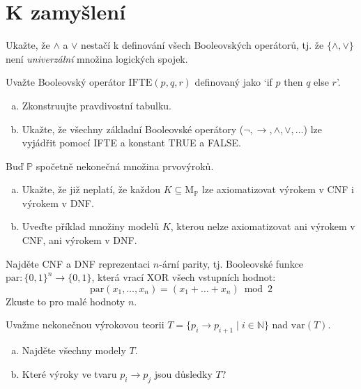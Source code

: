 \documentclass[a4paper,11pt]{amsart}
\begin{document}
\section*{K zamyšlení}


\begin{problem}
    
    Ukažte, že $\wedge$ a $\vee$ nestačí k definování všech Booleovských operátorů, tj. že $\{\wedge,\vee\}$ není \emph{univerzální} množina logických spojek.

\end{problem}


\begin{problem}
    
    Uvažte Booleovský operátor $\mathrm{IFTE}(p, q, r)$ definovaný jako `if $p$ then $q$ else $r$'. 
    \begin{enumerate}[(a)]
        \item Zkonstruujte pravdivostní tabulku.
        \item Ukažte, že všechny základní Booleovské operátory ($\neg, \to, \wedge,\vee,\dots$) lze vyjádřit pomocí IFTE a konstant TRUE a FALSE.
    \end{enumerate}

\end{problem}


\begin{problem} 
    
    Buď $\mathbb P$ spočetně nekonečná množina prvovýroků.    
    \begin{enumerate}[(a)]
        \item Ukažte, že již neplatí, že každou $K\subseteq \mathrm{M}_\mathbb P$ lze axiomatizovat výrokem v CNF i výrokem v DNF.
        \item  Uveďte příklad množiny modelů $K$, kterou nelze axiomatizovat ani výrokem v CNF, ani výrokem v DNF.
    \end{enumerate}

\end{problem}


\begin{problem} 
    
    Najděte CNF a DNF reprezentaci $n$-ární parity, tj. Booleovské funkce $\mathrm{par}\colon\{0,1\}^n\to \{0,1\}$,
    která vrací XOR všech vstupních hodnot:
    $$
    \mathrm{par}(x_1,\dots,x_n)=(x_1+\dots+x_n)\bmod 2
    $$
    Zkuste to pro malé hodnoty $n$.

\end{problem}


\begin{problem}

    Uvažme nekonečnou výrokovou teorii $T=\{p_i \to p_{i+1}\mid i\in \mathbb{N}\}$ nad $\mathrm{var}(T)$. 
    \begin{enumerate}[(a)]
        \item Najděte všechny modely $T$.
        \item Které výroky ve tvaru  $p_i \to p_j$ jsou důsledky $T$?        
    \end{enumerate}

\end{problem}
\end{document}
